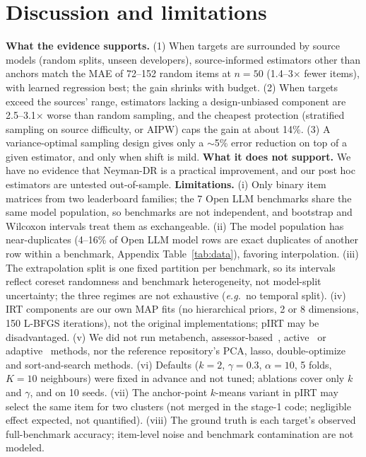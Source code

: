 \documentclass{article}
\newcommand{\eg}{\emph{e.g.}}
\begin{document}
\section{Discussion and limitations}
\textbf{What the evidence supports.}
(1) When targets are surrounded by source models (random splits, unseen developers), source-informed estimators other than anchors match the MAE of 72--152 random items at $n{=}50$ (1.4--3$\times$ fewer items), with learned regression best; the gain shrinks with budget.
(2) When targets exceed the sources' range, estimators lacking a design-unbiased component are 2.5--3.1$\times$ worse than random sampling, and the cheapest protection (stratified sampling on source difficulty, or AIPW) caps the gain at about 14\%.
(3) A variance-optimal sampling design gives only a $\sim$5\% error reduction on top of a given estimator, and only when shift is mild.
\textbf{What it does not support.} We have no evidence that Neyman-DR is a practical improvement, and our post hoc estimators are untested out-of-sample.
\textbf{Limitations.}
(i) Only binary item matrices from two leaderboard families; the 7 Open LLM benchmarks share the same model population, so benchmarks are not independent, and bootstrap and Wilcoxon intervals treat them as exchangeable.
(ii) The model population has near-duplicates (4--16\% of Open LLM model rows are exact duplicates of another row within a benchmark, Appendix Table~\ref{tab:data}), favoring interpolation.
(iii) The extrapolation split is one fixed partition per benchmark, so its intervals reflect coreset randomness and benchmark heterogeneity, not model-split uncertainty; the three regimes are not exhaustive (\eg\ no temporal split).
(iv) IRT components are our own MAP fits (no hierarchical priors, 2 or 8 dimensions, 150 L-BFGS iterations), not the original implementations; pIRT may be disadvantaged.
(v) We did not run metabench, assessor-based~\citep{pacchiardi2024100}, active~\citep{li2025active} or adaptive~\citep{balkir2026adaptive} methods, nor the reference repository's PCA, lasso, double-optimize and sort-and-search methods.
(vi) Defaults ($k{=}2$, $\gamma{=}0.3$, $\alpha{=}10$, 5 folds, $K{=}10$ neighbours) were fixed in advance and not tuned; ablations cover only $k$ and $\gamma$, and on 10 seeds.
(vii) The anchor-point $k$-means variant in pIRT may select the same item for two clusters (not merged in the stage-1 code; negligible effect expected, not quantified).
(viii) The ground truth is each target's observed full-benchmark accuracy; item-level noise and benchmark contamination are not modeled.
\end{document}
